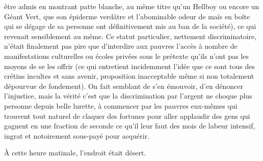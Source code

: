 être admis en montrant patte blanche, au même titre qu’un Hellboy ou encore un Géant Vert, que son épiderme verdâtre et l’abominable odeur de maïs en boîte qui se dégage de sa personne ont définitivement mis au ban de la société), ce qui revenait sensiblement au même. Ce statut particulier, nettement discriminatoire, n’était finalement pas pire que d’interdire aux pauvres l’accès à nombre de manifestations culturelles ou écoles privées sous le prétexte qu’ils n’ont pas les moyens de se les offrir (ce qui entretient incidemment l’idée que ce sont tous des crétins incultes et sans avenir, proposition inacceptable même si non totalement dépourvue de fondement). On fait semblant de s’en émouvoir, d’en dénoncer l’injustice, mais la vérité c’est que la discrimination par l’argent ne choque plus personne depuis belle lurette, à commencer par les pauvres eux-mêmes qui trouvent tout naturel de claquer des fortunes pour aller applaudir des gens qui gagnent en une fraction de seconde ce qu’il leur faut des mois de labeur intensif, ingrat et notoirement sous-payé pour acquérir.

À cette heure matinale, l’endroit était désert.


